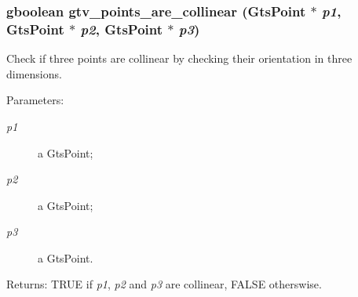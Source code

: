 \subsubsection{\setlength{\rightskip}{0pt plus 5cm}gboolean gtv\_\-points\_\-are\_\-collinear (GtsPoint $\ast$ {\em p1}, GtsPoint $\ast$ {\em p2}, GtsPoint $\ast$ {\em p3})}\label{group__geometry_g1d9b22104f8f85ab07bc5a71e0a77f3c}


Check if three points are collinear by checking their orientation in three dimensions.

\begin{Desc}
\item[Parameters:]
\begin{description}
\item[{\em p1}]a GtsPoint; \item[{\em p2}]a GtsPoint; \item[{\em p3}]a GtsPoint.\end{description}
\end{Desc}
\begin{Desc}
\item[Returns:]TRUE if {\em p1\/}, {\em p2\/} and {\em p3\/} are collinear, FALSE otherswise. \end{Desc}
